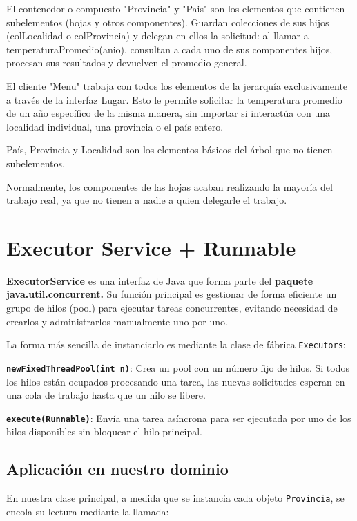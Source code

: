 \documentclass[11pt,a4paper]{article}
\begin{document}
El contenedor o compuesto "Provincia" y "Pais" son los elementos que contienen
subelementos (hojas y otros componentes). Guardan colecciones de sus hijos
(colLocalidad o colProvincia) y delegan en ellos la solicitud: al llamar a
temperaturaPromedio(anio), consultan a cada uno de sus componentes hijos,
procesan sus resultados y devuelven el promedio general.

El cliente "Menu" trabaja con todos los elementos de la jerarquía exclusivamente
a través de la interfaz Lugar. Esto le permite solicitar la temperatura promedio
de un año específico de la misma manera, sin importar si interactúa con una
localidad individual, una provincia o el país entero.

País, Provincia y Localidad son los elementos básicos del árbol que no tienen
subelementos.

Normalmente, los componentes de las hojas acaban realizando la mayoría del
trabajo real, ya que no tienen a nadie a quien delegarle el trabajo.

\section{Executor Service + Runnable}

\textbf{ExecutorService} es una interfaz de Java que forma parte del
\textbf{paquete java.util.concurrent.} Su función principal es gestionar de
forma eficiente un grupo de hilos (pool) para ejecutar tareas concurrentes,
evitando necesidad de crearlos y administrarlos manualmente uno por uno.

La forma más sencilla de instanciarlo es mediante la clase de fábrica \texttt{Executors}:

\textbf{\texttt{newFixedThreadPool(int n)}}: Crea un pool con un número fijo de
hilos. Si todos los hilos están ocupados procesando una tarea, las nuevas
solicitudes esperan en una cola de trabajo hasta que un hilo se libere.

\textbf{\texttt{execute(Runnable)}}: Envía una tarea asíncrona para ser
ejecutada por uno de los hilos disponibles sin bloquear el hilo principal.

\subsection{Aplicación en nuestro dominio}

En nuestra clase principal, a medida que se instancia cada objeto
\texttt{Provincia}, se encola su lectura mediante la llamada:
\end{document}
